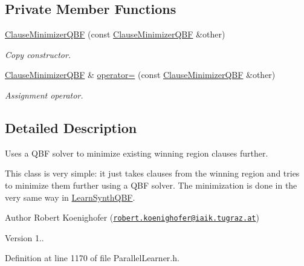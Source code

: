 \subsection*{Private Member Functions}
\begin{DoxyCompactItemize}
\item 
\hyperlink{classClauseMinimizerQBF_ac6392b5d3f312013b93d60d3a6f47283}{Clause\-Minimizer\-Q\-B\-F} (const \hyperlink{classClauseMinimizerQBF}{Clause\-Minimizer\-Q\-B\-F} \&other)
\begin{DoxyCompactList}\small\item\em Copy constructor. \end{DoxyCompactList}\item 
\hyperlink{classClauseMinimizerQBF}{Clause\-Minimizer\-Q\-B\-F} \& \hyperlink{classClauseMinimizerQBF_a42489977ed8a763f6ea8912c6d45218f}{operator=} (const \hyperlink{classClauseMinimizerQBF}{Clause\-Minimizer\-Q\-B\-F} \&other)
\begin{DoxyCompactList}\small\item\em Assignment operator. \end{DoxyCompactList}\end{DoxyCompactItemize}


\subsection{Detailed Description}
Uses a Q\-B\-F solver to minimize existing winning region clauses further. 

This class is very simple\-: it just takes clauses from the winning region and tries to minimize them further using a Q\-B\-F solver. The minimization is done in the very same way in \hyperlink{classLearnSynthQBF}{Learn\-Synth\-Q\-B\-F}.

\begin{DoxyAuthor}{Author}
Robert Koenighofer (\href{mailto:robert.koenighofer@iaik.tugraz.at}{\tt robert.\-koenighofer@iaik.\-tugraz.\-at}) 
\end{DoxyAuthor}
\begin{DoxyVersion}{Version}
1.. 
\end{DoxyVersion}


Definition at line 1170 of file Parallel\-Learner.\-h.




